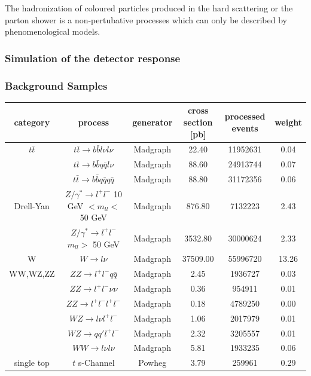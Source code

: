 The hadronization of coloured particles produced in the hard scattering or the parton shower is a non-pertubative processes which can only be described by phenomenological models. 


\subsubsection{Simulation of the detector response}

\subsubsection{Background Samples} 
\begin{table}
\small
\begin{center}
\begin{tabular}{c|c|c|c|c|c}
category & process & generator &  cross section [pb] & processed events & weight\\
\hline 
$t\bar{t}$ & $t\bar{t} \rightarrow b\bar{b}l\nu l\nu$ & Madgraph & 22.40 & 11952631 & 0.04 \\
 & $t\bar{t} \rightarrow b\bar{b}q\bar{q}l\nu$ & Madgraph & 88.60 & 24913744 & 0.07 \\
 & $t\bar{t} \rightarrow b\bar{b}q\bar{q}q\bar{q}$ & Madgraph & 88.80 & 31172356 & 0.06 \\
\hline 
Drell-Yan & $Z/\gamma^{*} \rightarrow l^{+}l^{-}$ 10 GeV $< m_{ll} <$ 50 GeV & Madgraph & 876.80 & 7132223 & 2.43 \\
 & $Z/\gamma^{*} \rightarrow l^{+}l^{-}$ $m_{ll} >$ 50 GeV & Madgraph & 3532.80 & 30000624 & 2.33 \\
\hline 
W & $W \rightarrow l\nu$ & Madgraph & 37509.00 & 55996720 & 13.26 \\
\hline 
WW,WZ,ZZ & $ZZ \rightarrow l^{+}l^{-}q\bar{q}$ & Madgraph & 2.45 & 1936727 & 0.03 \\
 & $ZZ \rightarrow l^{+}l^{-}\nu\nu$ & Madgraph & 0.36 & 954911 & 0.01 \\
 & $ZZ \rightarrow l^{+}l^{-}l^{+}l^{-}$ & Madgraph & 0.18 & 4789250 & 0.00 \\
 & $WZ \rightarrow l\nu l^{+}l^{-}$ & Madgraph & 1.06 & 2017979 & 0.01 \\
 & $WZ \rightarrow qq'l^{+}l^{-}$ & Madgraph & 2.32 & 3205557 & 0.01 \\
 & $WW \rightarrow l\nu l\nu$ & Madgraph & 5.81 & 1933235 & 0.06 \\
\hline 
single top & $t$ s-Channel & Powheg & 3.79 & 259961 & 0.29 \\

\end{tabular}
\end{center}
\end{table}
